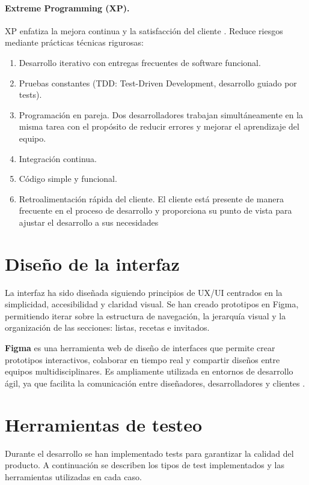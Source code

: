 \paragraph{Extreme Programming (XP).} XP enfatiza la mejora continua y la satisfacción del cliente \cite{extreme-programming}. Reduce riesgos mediante prácticas técnicas rigurosas:

\begin{enumerate}
    \item Desarrollo iterativo con entregas frecuentes de software funcional.
    \item Pruebas constantes (TDD: Test-Driven Development, desarrollo guiado por tests).
    \item Programación en pareja. Dos desarrolladores trabajan simultáneamente en la misma tarea con el propósito de reducir errores y mejorar el aprendizaje del equipo.
    \item Integración continua.
    \item Código simple y funcional.
    \item Retroalimentación rápida del cliente. El cliente está presente de manera frecuente en el proceso de desarrollo y proporciona su punto de vista para ajustar el desarrollo a sus necesidades
\end{enumerate}

\section{Diseño de la interfaz}

La interfaz ha sido diseñada siguiendo principios de UX/UI centrados en la simplicidad, accesibilidad y claridad visual. Se han creado prototipos en Figma, permitiendo iterar sobre la estructura de navegación, la jerarquía visual y la organización de las secciones: listas, recetas e invitados.

\textbf{Figma} es una herramienta web de diseño de interfaces que permite crear prototipos interactivos, colaborar en tiempo real y compartir diseños entre equipos multidisciplinares. Es ampliamente utilizada en entornos de desarrollo ágil, ya que facilita la comunicación entre diseñadores, desarrolladores y clientes \cite{figma}.

\section{Herramientas de testeo}
\label{sec:test}
Durante el desarrollo se han implementado tests para garantizar la calidad del producto. A continuación se describen los tipos de test implementados y las herramientas utilizadas en cada caso.

